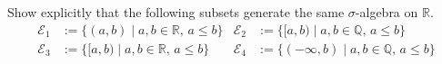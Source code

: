 \begin{solution}
    
\end{solution}
%
%
%
\begin{question}
\end{question}
%
%
%
\begin{question}
\end{question}
\begin{question}
    Show explicitly that the following subsets generate the same \(\sigma\)-algebra on \(\mathbb{R}\).
    \begin{align}
        \mathcal{E}_1 &:= \{(a, b) \mid a, b \in \mathbb{R}, \, a \leq b\} &         \mathcal{E}_2 &:= \{[a, b) \mid a, b \in \mathbb{Q}, \, a \leq b\} \\
        \mathcal{E}_3 &:= \{[a, b) \mid a, b \in \mathbb{R}, \, a \leq b\} &
        \mathcal{E}_4 &:= \{(-\infty, b) \mid a, b \in \mathbb{Q}, \, a \leq b\}
    \end{align}
\end{question}

